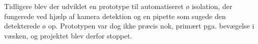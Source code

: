 Tidligere blev der udviklet en prototype til automatiseret ø isolation, der fungerede ved hjælp af kamera detektion og en pipette som sugede den detekterede ø op. Prototypen var dog ikke præcis nok, primært pga. bevægelse i væsken, og projektet blev derfor stoppet.
 

%
%
%
% 
% 
% 
% 
% 

